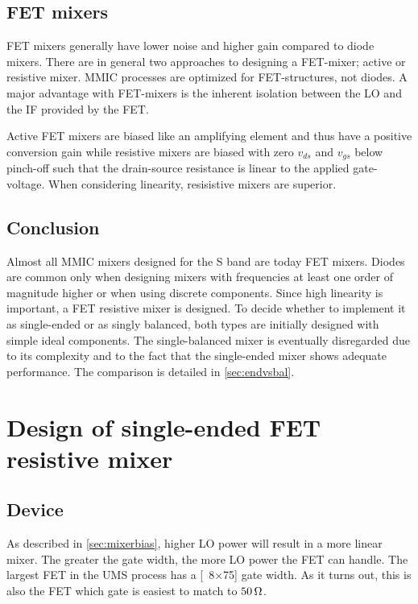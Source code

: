 		\subsection{FET mixers}\label{sec:fet_mixers}
			FET mixers generally have lower noise and higher gain compared to diode mixers. There are in general two approaches to designing a FET-mixer; active or resistive mixer. MMIC processes are optimized for FET-structures, not diodes. A major advantage with FET-mixers is the inherent isolation between the LO and the IF provided by the FET.

			Active FET mixers are biased like an amplifying element and thus have a positive conversion gain while resistive mixers are biased with zero $v_{ds}$ and $v_{gs}$ below pinch-off such that the drain-source resistance is linear to the applied gate-voltage. When considering linearity, resisistive mixers are superior.\autocites{maas92,maas98}

		\subsection{Conclusion}
			Almost all MMIC mixers designed for the S band are today FET mixers. Diodes are common only when designing mixers with frequencies at least one order of magnitude higher or when using discrete components. Since high linearity is important, a FET resistive mixer is designed. To decide whether to implement it as single-ended or as singly balanced, both types are initially designed with simple ideal components. The single-balanced mixer is eventually disregarded due to its complexity and to the fact that the single-ended mixer shows adequate performance. The comparison is detailed in \autoref{sec:endvsbal}.

	\section{Design of single-ended FET resistive mixer}
		\subsection{Device}\label{sec:mixerdevice}
			As described in \autoref{sec:mixerbias}, higher LO power will result in a more linear mixer. The greater the gate width, the more LO power the FET can handle. The largest FET in the UMS process has a \unit[8$\times$75]{\mum} gate width. As it turns out, this is also the FET which gate is easiest to match to $\unit[50]{\Omega}$.\autocite{gustavsson07}

